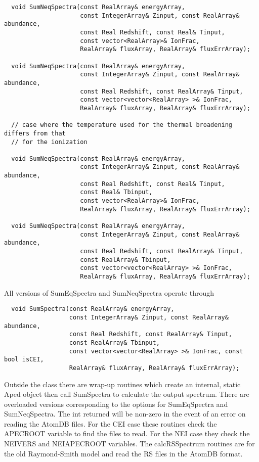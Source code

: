 \documentclass[11pt]{book}
\begin{document}
\begin{verbatim}
  void SumNeqSpectra(const RealArray& energyArray, 
                     const IntegerArray& Zinput, const RealArray& abundance,
                     const Real Redshift, const Real& Tinput,
                     const vector<RealArray>& IonFrac, 
                     RealArray& fluxArray, RealArray& fluxErrArray);

  void SumNeqSpectra(const RealArray& energyArray, 
                     const IntegerArray& Zinput, const RealArray& abundance,
                     const Real Redshift, const RealArray& Tinput,
                     const vector<vector<RealArray> >& IonFrac, 
                     RealArray& fluxArray, RealArray& fluxErrArray);

  // case where the temperature used for the thermal broadening differs from that
  // for the ionization

  void SumNeqSpectra(const RealArray& energyArray, 
                     const IntegerArray& Zinput, const RealArray& abundance,
                     const Real Redshift, const Real& Tinput,
                     const Real& Tbinput, 
                     const vector<RealArray>& IonFrac, 
                     RealArray& fluxArray, RealArray& fluxErrArray);

  void SumNeqSpectra(const RealArray& energyArray, 
                     const IntegerArray& Zinput, const RealArray& abundance,
                     const Real Redshift, const RealArray& Tinput,
                     const RealArray& Tbinput, 
                     const vector<vector<RealArray> >& IonFrac, 
                     RealArray& fluxArray, RealArray& fluxErrArray);
\end{verbatim}

All versions of SumEqSpectra and SumNeqSpectra operate through

\begin{verbatim}
  void SumSpectra(const RealArray& energyArray, 
                  const IntegerArray& Zinput, const RealArray& abundance,
                  const Real Redshift, const RealArray& Tinput,
                  const RealArray& Tbinput, 
                  const vector<vector<RealArray> >& IonFrac, const bool isCEI,
                  RealArray& fluxArray, RealArray& fluxErrArray);
\end{verbatim}

Outside the class there are wrap-up routines which create an internal,
static Aped object then call SumSpectra to calculate the output
spectrum. There are overloaded versions corresponding to the options
for SumEqSpectra and SumNeqSpectra. The int returned will be non-zero
in the event of an error on reading the AtomDB files. For the CEI case
these routines check the APECROOT variable to find the files to
read. For the NEI case they check the NEIVERS and NEIAPECROOT 
variables. The calcRSSpectrum routines are for the old Raymond-Smith
model and read the RS files in the AtomDB format.
\end{document}
